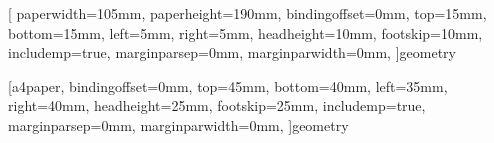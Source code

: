 [
  paperwidth=105mm, 
  paperheight=190mm,
  bindingoffset=0mm,
  top=15mm,  
  bottom=15mm,
  left=5mm,  
  right=5mm,  
  headheight=10mm,
  footskip=10mm,
  includemp=true,
  marginparsep=0mm, 
  marginparwidth=0mm,  
  ]geometry

[a4paper, 
  bindingoffset=0mm,
  top=45mm,  
  bottom=40mm,
  left=35mm,  
  right=40mm,  
  headheight=25mm,
  footskip=25mm,
 includemp=true,
 marginparsep=0mm, 
marginparwidth=0mm,  
  ]geometry
